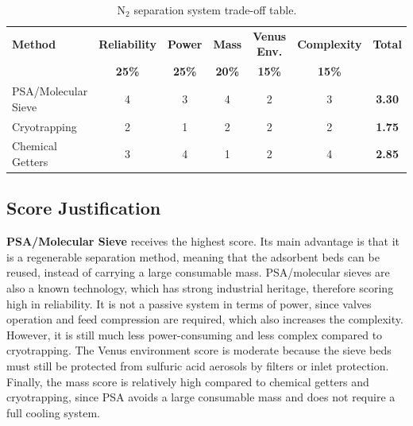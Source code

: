 \begin{table}[H]
\centering
\caption{N$_2$ separation system trade-off table.}
\label{tab:n2_tradeoff_table}
\footnotesize
\renewcommand{\arraystretch}{1.12}
\setlength{\tabcolsep}{5pt}
\begin{tabularx}{\textwidth}{@{}X c c c c c c@{}}
\toprule
\textbf{Method} & \textbf{Reliability} & \textbf{Power} & \textbf{Mass} & \textbf{Venus Env.} & \textbf{Complexity} & \textbf{Total} \\
& \textbf{25\%} & \textbf{25\%} & \textbf{20\%} & \textbf{15\%} & \textbf{15\%} & \\
\midrule
PSA/Molecular Sieve 
& \cellcolor{scorefour}4 
& \cellcolor{scorethree}3 
& \cellcolor{scorefour}4 
& \cellcolor{scoretwo}2 
& \cellcolor{scorethree}3 
& \textbf{3.30} \\

Cryotrapping 
& \cellcolor{scoretwo}2 
& \cellcolor{scoreone}1 
& \cellcolor{scoretwo}2 
& \cellcolor{scoretwo}2 
& \cellcolor{scoretwo}2 
& \textbf{1.75} \\

Chemical Getters 
& \cellcolor{scorethree}3 
& \cellcolor{scorefour}4 
& \cellcolor{scoreone}1 
& \cellcolor{scoretwo}2 
& \cellcolor{scorefour}4 
& \textbf{2.85} \\
\bottomrule
\end{tabularx}
\end{table}

\subsection{Score Justification}
\label{subsec:n2_score_justification}

\textbf{PSA/Molecular Sieve} receives the highest score. Its main advantage is that it is a regenerable separation method, meaning that the adsorbent beds can be reused, instead of carrying a large consumable mass. PSA/molecular sieves are also a known technology, which has strong industrial heritage, therefore scoring high in reliability. It is not a passive system in terms of power, since valves operation and feed compression are required, which also increases the complexity. However, it is still much less power-consuming and less complex compared to cryotrapping. The Venus environment score is moderate because the sieve beds must still be protected from sulfuric acid aerosols by filters or inlet protection. Finally, the mass score is relatively high compared to chemical getters and cryotrapping, since PSA avoids a large consumable mass and does not require a full cooling system.

